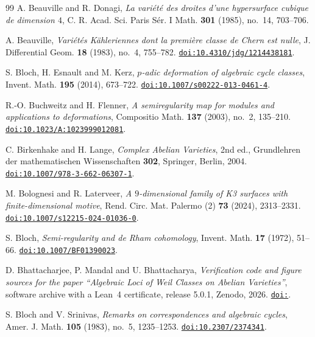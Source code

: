 \documentclass[11pt,reqno]{amsart}
\theoremstyle{plain}
\theoremstyle{definition}
\theoremstyle{remark}
\begin{document}
\begin{thebibliography}{99}
A. Beauville and R. Donagi,
\emph{La vari\'et\'e des droites d'une hypersurface cubique de dimension
$4$},
C. R. Acad. Sci. Paris S\'er. I Math. \textbf{301} (1985), no.~14, 703--706.

A. Beauville,
\emph{Vari\'et\'es K\"ahleriennes dont la premi\`ere classe de Chern est
nulle},
J. Differential Geom. \textbf{18} (1983), no.~4, 755--782.
\href{https://doi.org/10.4310/jdg/1214438181}{\texttt{doi:10.4310/jdg/1214438181}}.

S. Bloch, H. Esnault and M. Kerz,
\emph{$p$-adic deformation of algebraic cycle classes},
Invent. Math. \textbf{195} (2014), 673--722.
\href{https://doi.org/10.1007/s00222-013-0461-4}{\texttt{doi:10.1007/s00222-013-0461-4}}.

R.-O. Buchweitz and H. Flenner,
\emph{A semiregularity map for modules and applications to deformations},
Compositio Math. \textbf{137} (2003), no.~2, 135--210.
\href{https://doi.org/10.1023/A:1023999012081}{\texttt{doi:10.1023/A:1023999012081}}.

C. Birkenhake and H. Lange,
\emph{Complex Abelian Varieties}, 2nd ed.,
Grundlehren der mathematischen Wissenschaften \textbf{302},
Springer, Berlin, 2004.
\href{https://doi.org/10.1007/978-3-662-06307-1}{\texttt{doi:10.1007/978-3-662-06307-1}}.

M. Bolognesi and R. Laterveer,
\emph{A $9$-dimensional family of K3 surfaces with finite-dimensional motive},
Rend. Circ. Mat. Palermo (2) \textbf{73} (2024), 2313--2331.
\href{https://doi.org/10.1007/s12215-024-01036-0}{\texttt{doi:10.1007/s12215-024-01036-0}}.

S. Bloch,
\emph{Semi-regularity and de Rham cohomology},
Invent. Math. \textbf{17} (1972), 51--66.
\href{https://doi.org/10.1007/BF01390023}{\texttt{doi:10.1007/BF01390023}}.

D. Bhattacharjee, P. Mandal and U. Bhattacharya,
\emph{Verification code and figure sources for the paper ``Algebraic Loci of
Weil Classes on Abelian Varieties''}, software archive with a Lean~4
certificate, release 5.0.1, Zenodo, 2026.
\href{https://doi.org/\zenodoCodeID}{\texttt{doi:\zenodoCodeID}}.

S. Bloch and V. Srinivas,
\emph{Remarks on correspondences and algebraic cycles},
Amer. J. Math. \textbf{105} (1983), no.~5, 1235--1253.
\href{https://doi.org/10.2307/2374341}{\texttt{doi:10.2307/2374341}}.


\end{thebibliography}
\end{document}
